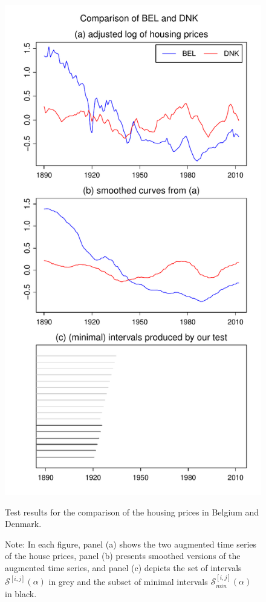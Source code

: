 \documentclass[a4paper,12pt]{article}
\begin{document}
\begin{figure}[b!]
\hspace{0.25cm}
\begin{minipage}[t]{0.49\textwidth}
\includegraphics[width=\textwidth]{output/plots/hp/hp_BEL_vs_DNK}
\caption{Test results for the comparison of the housing prices in Belgium and Denmark.}\label{fig:hp:Belgium:Denmark}
\end{minipage}
\caption*{Note: In each figure, panel (a) shows the two augmented time series of the house prices, panel (b) presents smoothed versions of the augmented time series, and panel (c) depicts the set of intervals $\mathcal{S}^{[i, j]}(\alpha)$ in grey and the subset of minimal intervals $\mathcal{S}^{[i, j]}_{min}(\alpha)$ in black.}
\end{figure}
\end{document}
